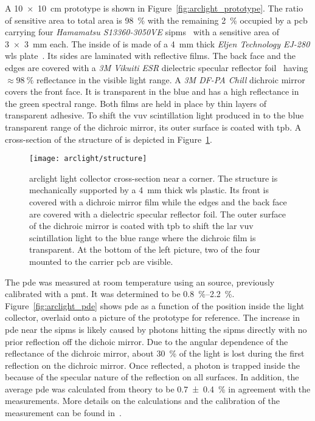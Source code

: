 A \SI{10 x 10}{\centi\metre} \AL{} prototype is shown in Figure~\ref{fig:arclight_prototype}.
The ratio of sensitive area to total area is \SI{98}{\percent} with the remaining \SI{2}{\percent} occupied by a \gls{pcb} carrying four \emph{Hamamatsu S13360-3050VE} \glspl{sipm}~\cite{arclight_sipm} with a sensitive area of \SI{3 x 3}{\milli\metre} each.
The inside of \AL{} is made of a \SI{4}{\milli\metre} thick \emph{Eljen Technology EJ-280} \gls{wls} plate~\cite{arclight_wls}.
Its sides are laminated with reflective films.
The back face and the edges are covered with a \emph{3M Vikuiti ESR} dielectric specular reflector foil~\cite{arclight_esr} having $\approx \SI{98}{\percent}$ reflectance in the visible light range.
A \emph{3M DF-PA Chill} dichroic mirror~\cite{arclight_dichroic} covers the front face.
It is transparent in the blue and has a high reflectance in the green spectral range.
Both films are held in place by thin layers of transparent adhesive.
To shift the \gls{vuv} scintillation light produced in \lar{} to the blue transparent range of the dichroic mirror, its outer surface is coated with \gls{tpb}.
A cross-section of the structure of \AL{} is depicted in Figure~\ref{fig:arclight_structure}.

\begin{figure}[htb]
	\centering
	\texttt{[image: arclight/structure]}
	\caption[ light collector cross-section]{%
		\acrshort{arclight} light collector cross-section near a corner.
		The structure is mechanically supported by a \SI{4}{\milli\metre} thick \acrshort{wls} plastic.
		Its front is covered with a dichroic mirror film while the edges and the back face are covered with a dielectric specular reflector foil.
		The outer surface of the dichroic mirror is coated with \acrshort{tpb} to shift the \acrshort{lar} \acrshort{vuv} scintillation light to the blue range where the dichroic film is transparent.
		At the bottom of the left picture, two of the four  mounted to the carrier \acrshort{pcb} are visible.
	}
	\label{fig:arclight_structure}
\end{figure}

The \gls{pde} was measured at room temperature using an  source, previously calibrated with a \gls{pmt}.
It was determined to be \SIrange{0.8}{2.2}{\percent}.
Figure~\ref{fig:arclight_pde} shows \gls{pde} as a function of the position inside the light collector, overlaid onto a picture of the prototype for reference.
The increase in \gls{pde} near the \glspl{sipm} is likely caused by photons hitting the \glspl{sipm} directly with no prior reflection off the dichoic mirror.
Due to the angular dependence of the reflectance of the dichroic mirror, about \SI{30}{\percent} of the light is lost during the first reflection on the dichroic mirror.
Once reflected, a photon is trapped inside the \AL{} because of the specular nature of the reflection on all surfaces.
In addition, the average \gls{pde} was calculated from theory to be \SI{0.7 +- 0.4}{\percent} in agreement with the measurements.
More details on the calculations and the calibration of the measurement can be found in~\cite{arclight}.

